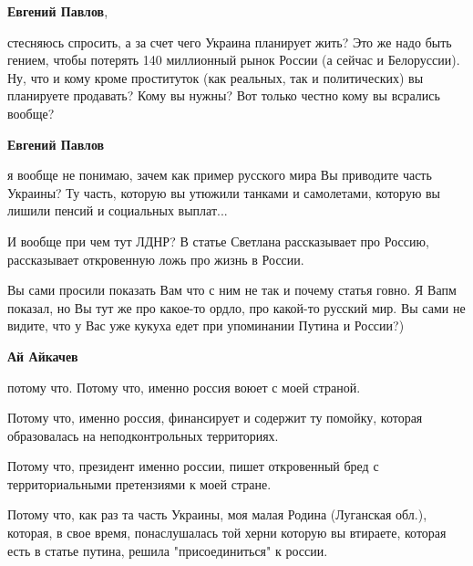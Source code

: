 \begin{itemize}
\begin{itemize}
 
\textbf{Евгений Павлов}, 

стесняюсь спросить, а за счет чего Украина планирует жить? Это же надо быть
гением, чтобы потерять 140 миллионный рынок России (а сейчас и Белоруссии). Ну,
что и кому кроме проституток (как реальных, так и политических) вы планируете
продавать? Кому вы нужны? Вот только честно кому вы всрались вообще?

 
\textbf{Евгений Павлов} 

я вообще не понимаю, зачем как пример русского мира Вы приводите часть Украины?
Ту часть, которую вы утюжили танками и самолетами, которую вы лишили пенсий и
социальных выплат... 

И вообще при чем тут ЛДНР? В статье Светлана рассказывает про Россию,
рассказывает откровенную ложь про жизнь в России. 

Вы сами просили показать Вам что с ним не так и почему статья говно. Я Вапм
показал, но Вы тут же про какое-то ордло, про какой-то русский мир. Вы сами не
видите, что у Вас уже кукуха едет при упоминании Путина и России?)


 
\textbf{Ай Айкачев} 

потому что. Потому что, именно россия воюет с моей страной. 

Потому что, именно россия, финансирует и содержит ту помойку, которая
образовалась на неподконтрольных территориях. 

Потому что, президент именно россии, пишет откровенный бред с территориальными
претензиями к моей стране. 

Потому что, как раз та часть Украины, моя малая Родина (Луганская обл.),
которая, в свое время, понаслушалась той херни которую вы втираете, которая
есть в статье путина, решила "присоединиться" к россии. 


\end{itemize}
\end{itemize}
